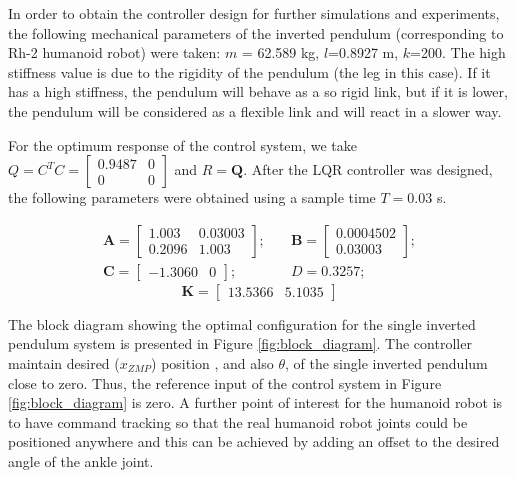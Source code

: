 In order to obtain the controller design for further simulations and experiments, the following mechanical parameters of the inverted pendulum (corresponding to Rh-2 humanoid robot) were taken: $m$ = 62.589 kg, $l$=0.8927 m, $k$=200. The high stiffness value is due to the rigidity of the pendulum (the leg in this case). If it has a high stiffness, the pendulum will behave as a so rigid link, but if it is lower, the pendulum will be considered as a flexible link and will react in a slower way.

For the optimum response of the control system, we take $Q = C^{T}C = \begin{bmatrix}
0.9487 & 0\\
0 & 0
\end{bmatrix}$ and $R = \mathbf{Q}$. 
After the LQR controller was designed, the following parameters were obtained using a sample time $T = 0.03$ s.

\begin{align}
\mathbf{A} = 
	\begin{bmatrix}
		1.003 & 0.03003 \\
		0.2096 & 1.003
	\end{bmatrix}; & \quad
\mathbf{B} = 
	\begin{bmatrix}
		0.0004502\\
		0.03003
	\end{bmatrix}; \nonumber \\
\mathbf{C} = 
	\begin{bmatrix}
		-1.3060 & 0
	\end{bmatrix}; & \quad
D = 0.3257;
\label{eq:LQRparameters}
\end{align}
\begin{equation}
\mathbf{K} = 
	\begin{bmatrix}
		13.5366 & 5.1035
	\end{bmatrix}
\label{eq:LQRgain}
\end{equation}

The block diagram showing the optimal configuration for the single inverted pendulum system is presented in Figure \ref{fig:block_diagram}. The controller maintain desired ($x_{ZMP}$) position , and also $\theta$, of the single inverted pendulum close to zero. Thus, the reference input of the control system in Figure \ref{fig:block_diagram} is zero. A further point of interest for the humanoid robot is to have command tracking so that the real humanoid robot joints could be positioned anywhere and this can be achieved by adding an offset to the desired angle of the ankle joint. 

